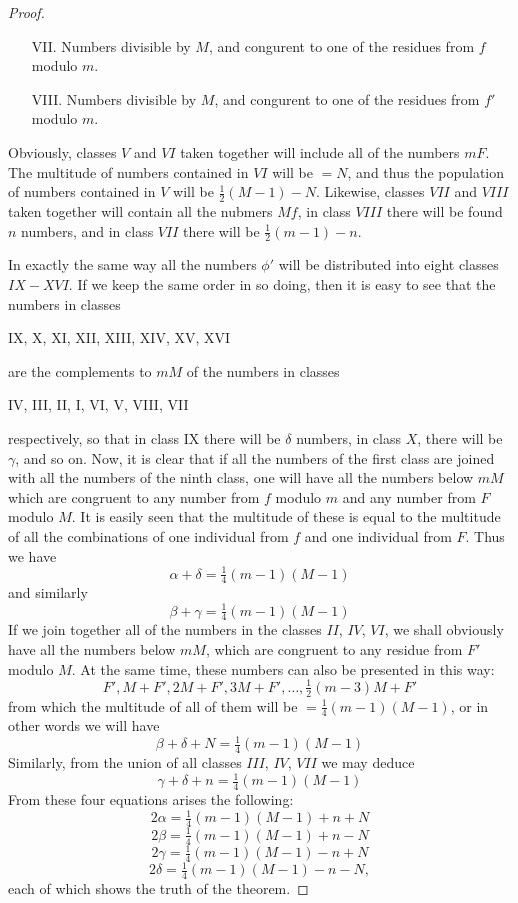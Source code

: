 \documentclass{book}
\theoremstyle{plain}
\theoremstyle{remark}
\begin{document}
\begin{proof}
\begin{enumerate}
\item[VII.] Numbers divisible by $M$, and congurent to one of the residues from $f$ modulo $m$.
\item[VIII.] Numbers divisible by $M$, and congurent to one of the residues from $f'$ modulo $m$.
\end{enumerate}
Obviously, classes $V$ and $VI$ taken together will include all of the numbers $mF$.  The multitude of numbers contained in $VI$ will be $=N$, and thus the population of numbers contained in $V$ will be $\tfrac{1}{2}(M-1)-N$.  Likewise, classes $VII$ and $VIII$ taken together will contain all the nubmers $Mf$, in class $VIII$ there will be found $n$ numbers, and in class $VII$ there will be $\tfrac{1}{2}(m-1)-n$.

In exactly the same way all the numbers $\phi'$ will be distributed into eight classes $IX-XVI$.  If we keep the same order in so doing, then it is easy to see that the numbers in classes
\begin{center} IX, X, XI, XII, XIII, XIV, XV, XVI  \end{center}
are  the complements to $mM$ of the numbers in classes
\begin{center} IV, III, II, I, VI, V, VIII, VII \end{center}
respectively, so that in class IX there will be $\delta$ numbers, in class $X$, there will be $\gamma$, and so on.  Now, it is clear that if all the numbers of the first class are joined with all the numbers of the ninth class, one will have all the numbers below $mM$ which are congruent to any number from $f$ modulo $m$ and any number from $F$ modulo $M$.   It is easily seen that the multitude of these is equal to the multitude of all the combinations of one individual from $f$ and one individual from $F$.  Thus we have 
\[ \alpha + \delta = \tfrac{1}{4}(m-1)(M-1) \]
and similarly 
\[ \beta + \gamma = \tfrac{1}{4}(m-1)(M-1) \]
If we join together all of the numbers in the classes $II$, $IV$, $VI$, we shall obviously have all the numbers below $mM$, which are congruent to any residue from $F'$ modulo $M$.  At the same time, these numbers can also be presented in this way:
\[ F', M+F', 2M+F', 3M+F',\dots, \tfrac{1}{2}(m-3)M + F' \]
from which the multitude of all of them will be $=\tfrac{1}{4}(m-1)(M-1)$, or in other words we will have 
\[ \beta + \delta + N = \tfrac{1}{4}(m-1)(M-1) \]
Similarly, from the union of all classes $III$, $IV$, $VII$ we may deduce
\[ \gamma + \delta + n = \tfrac{1}{4}(m-1)(M-1) \]
From these four equations arises the following:
\[ 2 \alpha = \tfrac{1}{4}(m-1)(M-1) + n + N \]
\[ 2 \beta = \tfrac{1}{4}(m-1)(M-1) + n - N \]
\[ 2 \gamma = \tfrac{1}{4}(m-1)(M-1) - n + N \]
\[ 2 \delta = \tfrac{1}{4}(m-1)(M-1) - n - N, \]
each of which shows the truth of the theorem.
\end{proof}
\end{document}
